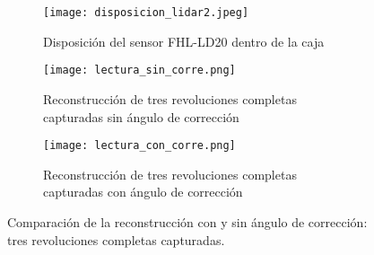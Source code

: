 \begin{figure}[H]
	\centering
	\begin{subfigure}{0.6\textwidth}
		\centering
		\texttt{[image: disposicion\_lidar2.jpeg]}
		\caption{Disposición del sensor FHL-LD20 dentro de la caja}
		\label{disposicion_lidar2}
		\vspace{1em}
	\end{subfigure}
	\begin{subfigure}{0.45\textwidth}
		\centering
		\texttt{[image: lectura\_sin\_corre.png]}
		\caption{Reconstrucción de tres revoluciones completas capturadas sin ángulo de corrección}
		\label{lectura_sin_corre}
	\end{subfigure}
	\hspace{1em}
	\begin{subfigure}{0.45\textwidth}
		\centering
		\texttt{[image: lectura\_con\_corre.png]}
		\caption{Reconstrucción de tres revoluciones completas capturadas con ángulo de corrección}
		\label{lectura_con_corre}
	\end{subfigure}
	\caption{Comparación de la reconstrucción con y sin ángulo de corrección: tres revoluciones completas capturadas.}
	\label{fig: comparación_con_sin_corre}
\end{figure}
 